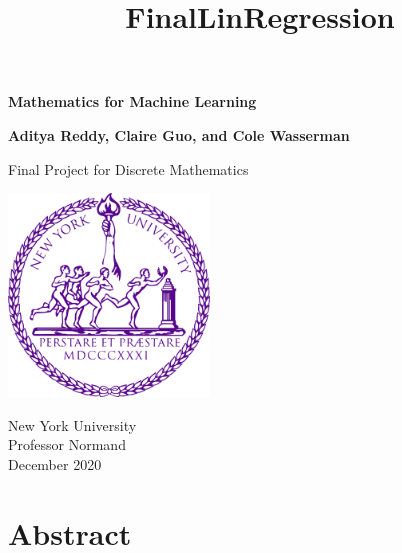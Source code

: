 \documentclass[11pt]{article}
\title{FinalLinRegression}
\begin{document}
\begin{titlepage}
   \begin{center}
       \vspace*{1cm}

       \huge \textbf{Mathematics for Machine Learning}

       \vspace{0.5cm}
        
            
       \vspace{1.5cm}

      
      \large \textbf{Aditya Reddy, Claire Guo, and Cole Wasserman}

      \vspace{35 mm}
            
       Final Project for Discrete Mathematics\\
            
       \vspace{0.8cm}
     
       \includegraphics[width=0.4\textwidth]{university}
        \vspace{20 mm}     
       
       New York University\\
       Professor Normand\\
       December 2020\
            
   \end{center}
\end{titlepage}

\pagestyle{fancy}
\fancyhf{}
\tableofcontents
\newpage

\section{Abstract}
\end{document}
